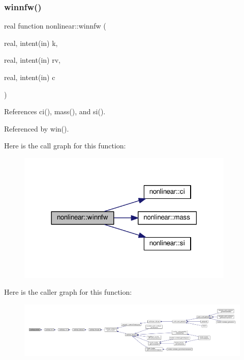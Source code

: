 \subsubsection{\texorpdfstring{winnfw()}{winnfw()}}
{\footnotesize\ttfamily real function nonlinear\+::winnfw (\begin{DoxyParamCaption}\item[{real, intent(in)}]{k,  }\item[{real, intent(in)}]{rv,  }\item[{real, intent(in)}]{c }\end{DoxyParamCaption})\hspace{0.3cm}{\ttfamily [private]}}



References ci(), mass(), and si().



Referenced by win().

Here is the call graph for this function\+:
\nopagebreak
\begin{figure}[H]
\begin{center}
\leavevmode
\includegraphics[width=294pt]{namespacenonlinear_ad0e2241407de1974edb07a5990f12ba3_cgraph}
\end{center}
\end{figure}
Here is the caller graph for this function\+:
\nopagebreak
\begin{figure}[H]
\begin{center}
\leavevmode
\includegraphics[width=350pt]{namespacenonlinear_ad0e2241407de1974edb07a5990f12ba3_icgraph}
\end{center}
\end{figure}
\mbox{\label{namespacenonlinear_acf30963fec3b82503de7d079f4091461}} 
